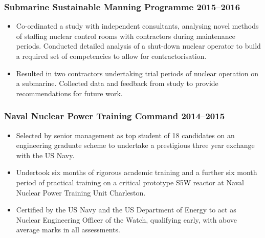 \documentclass[a4paper, oneside, final, 11pt]{scrartcl} %
\begin{document}
\subsubsection*{Submarine Sustainable Manning Programme \hfill 2015--2016}  
\normalfont
\begin{itemize}
	\item Co-ordinated a study with independent consultants, analysing novel methods of staffing nuclear control rooms with contractors during maintenance periods. Conducted detailed analysis of a shut-down nuclear operator to build a required set of competencies to allow for contractorisation.
	
	\item  Resulted in two contractors undertaking trial periods of nuclear operation on a submarine. Collected data and feedback from study to provide recommendations for future work. \end{itemize}


				
\subsubsection*{Naval Nuclear Power Training Command \hfill 2014--2015}  
\normalfont
\begin{itemize}
	\item Selected by senior management as top student of 18 candidates on an engineering graduate scheme to undertake a prestigious three year exchange with the US Navy. 
	
	\item Undertook six months of rigorous academic training and a further six month period of practical training on a critical prototype S5W reactor at Naval Nuclear Power Training Unit Charleston.
	\item Certified by the US Navy and the US Department of Energy to act as Nuclear Engineering Officer of the Watch, qualifying early, with above average marks in all assessments.
\end{itemize}


				
\end{document}
